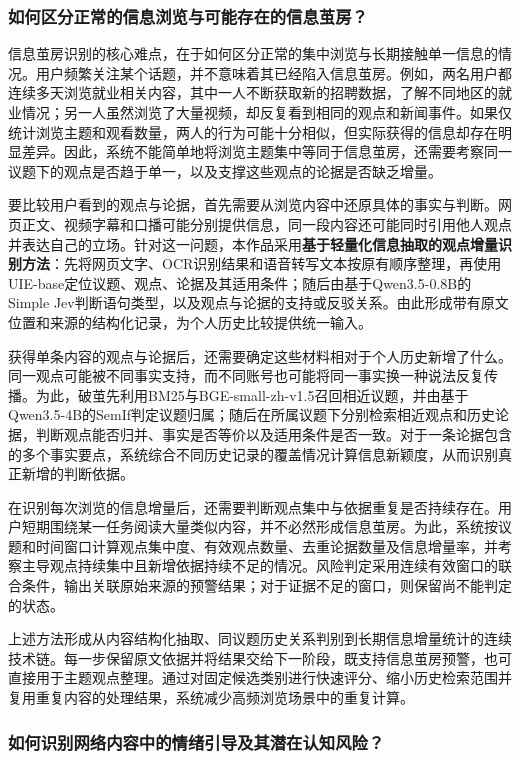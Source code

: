 \subsubsection{如何区分正常的信息浏览与可能存在的信息茧房？}\label{section:1.2.1}

信息茧房识别的核心难点，在于如何区分正常的集中浏览与长期接触单一信息的情况。用户频繁关注某个话题，并不意味着其已经陷入信息茧房。例如，两名用户都连续多天浏览就业相关内容，其中一人不断获取新的招聘数据，了解不同地区的就业情况；另一人虽然浏览了大量视频，却反复看到相同的观点和新闻事件。如果仅统计浏览主题和观看数量，两人的行为可能十分相似，但实际获得的信息却存在明显差异。因此，系统不能简单地将浏览主题集中等同于信息茧房，还需要考察同一议题下的观点是否趋于单一，以及支撑这些观点的论据是否缺乏增量。

要比较用户看到的观点与论据，首先需要从浏览内容中还原具体的事实与判断。网页正文、视频字幕和口播可能分别提供信息，同一段内容还可能同时引用他人观点并表达自己的立场。针对这一问题，本作品采用\textbf{基于轻量化信息抽取的观点增量识别方法}：先将网页文字、OCR识别结果和语音转写文本按原有顺序整理，再使用UIE-base定位议题、观点、论据及其适用条件；随后由基于Qwen3.5-0.8B的Simple Jev判断语句类型，以及观点与论据的支持或反驳关系。由此形成带有原文位置和来源的结构化记录，为个人历史比较提供统一输入。

获得单条内容的观点与论据后，还需要确定这些材料相对于个人历史新增了什么。同一观点可能被不同事实支持，而不同账号也可能将同一事实换一种说法反复传播。为此，破茧先利用BM25与BGE-small-zh-v1.5召回相近议题，并由基于Qwen3.5-4B的SemIf判定议题归属；随后在所属议题下分别检索相近观点和历史论据，判断观点能否归并、事实是否等价以及适用条件是否一致。对于一条论据包含的多个事实要点，系统综合不同历史记录的覆盖情况计算信息新颖度，从而识别真正新增的判断依据。

在识别每次浏览的信息增量后，还需要判断观点集中与依据重复是否持续存在。用户短期围绕某一任务阅读大量类似内容，并不必然形成信息茧房。为此，系统按议题和时间窗口计算观点集中度、有效观点数量、去重论据数量及信息增量率，并考察主导观点持续集中且新增依据持续不足的情况。风险判定采用连续有效窗口的联合条件，输出关联原始来源的预警结果；对于证据不足的窗口，则保留尚不能判定的状态。

上述方法形成从内容结构化抽取、同议题历史关系判别到长期信息增量统计的连续技术链。每一步保留原文依据并将结果交给下一阶段，既支持信息茧房预警，也可直接用于主题观点整理。通过对固定候选类别进行快速评分、缩小历史检索范围并复用重复内容的处理结果，系统减少高频浏览场景中的重复计算。

\subsubsection{如何识别网络内容中的情绪引导及其潜在认知风险？}\label{section:1.2.2}

